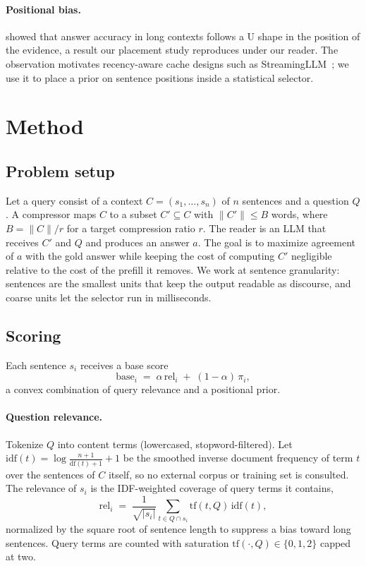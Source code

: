\documentclass{article}
\begin{document}
\paragraph{Positional bias.}
\citet{liu2023lost} showed that answer accuracy in long contexts follows
a U shape in the position of the evidence, a result our placement study
reproduces under our reader. The observation motivates recency-aware
cache designs such as StreamingLLM~\citep{xiao2023streaming}; we use it
to place a prior on sentence positions inside a statistical selector.

\section{Method}
\label{sec:method}

\subsection{Problem setup}
Let a query consist of a context $C=(s_1,\dots,s_n)$ of $n$ sentences
and a question $Q$. A compressor maps $C$ to a subset $C' \subseteq C$
with $\lVert C'\rVert \le B$ words, where $B=\lVert C\rVert / r$ for a
target compression ratio $r$. The reader is an LLM that receives $C'$ and
$Q$ and produces an answer $a$. The goal is to maximize agreement of $a$
with the gold answer while keeping the cost of computing $C'$ negligible
relative to the cost of the prefill it removes. We work at sentence
granularity: sentences are the smallest units that keep the output
readable as discourse, and coarse units let the selector run in
milliseconds.

\subsection{Scoring}
Each sentence $s_i$ receives a base score
\begin{equation}
\label{eq:base}
\mathrm{base}_i \;=\; \alpha\,\mathrm{rel}_i \;+\; (1-\alpha)\,\pi_i,
\end{equation}
a convex combination of query relevance and a positional prior.

\paragraph{Question relevance.}
Tokenize $Q$ into content terms (lowercased, stopword-filtered). Let
$\mathrm{idf}(t)=\log\frac{n+1}{\mathrm{df}(t)+1}+1$ be the smoothed
inverse document frequency of term $t$ over the sentences of $C$ itself,
so no external corpus or training set is consulted. The relevance of
$s_i$ is the IDF-weighted coverage of query terms it contains,
\begin{equation}
\label{eq:rel}
\mathrm{rel}_i \;=\;
\frac{1}{\sqrt{|s_i|}}\sum_{t \in Q \cap s_i}
\mathrm{tf}(t, Q)\,\mathrm{idf}(t),
\end{equation}
normalized by the square root of sentence length to suppress a bias
toward long sentences. Query terms are counted with saturation
$\mathrm{tf}(\cdot,Q) \in \{0,1,2\}$ capped at two.
\end{document}
